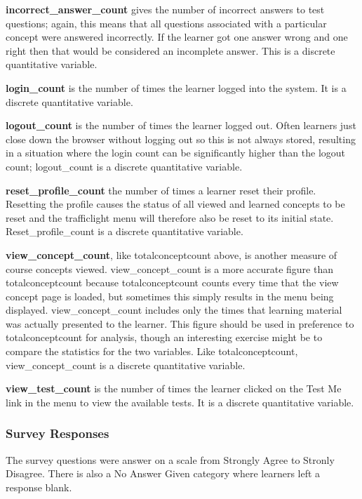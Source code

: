 \documentclass[12pt,twoside]{article}
\begin{document}
\textbf{incorrect\_answer\_count} gives the number of incorrect answers
to test questions; again, this means that all questions associated with
a particular concept were answered incorrectly. If the learner got one
answer wrong and one right then that would be considered an incomplete
answer. This is a discrete quantitative variable. 

\textbf{login\_count} is the number of times the learner logged into the
system. It is a discrete quantitative variable. 

\textbf{logout\_count} is the number of times the learner logged out.
Often learners just close down the browser without logging out so this
is not always stored, resulting in a situation where the login count
can be significantly higher than the logout count; logout\_count is a
discrete quantitative variable. 

\textbf{reset\_profile\_count} the number of times a learner reset their
profile. Resetting the profile causes the status of all viewed and
learned concepts to be reset and the trafficlight menu will therefore
also be reset to its initial state. Reset\_profile\_count is a discrete
quantitative variable. 

\textbf{view\_concept\_count}, like totalconceptcount above, is another
measure of course concepts viewed. view\_concept\_count is a more
accurate figure than totalconceptcount because totalconceptcount counts
every time that the view concept page is loaded, but sometimes this
simply results in the menu being displayed. view\_concept\_count
includes only the times that learning material was actually presented
to the learner. This figure should be used in preference to
totalconceptcount for analysis, though an interesting exercise might be
to compare the statistics for the two variables. Like
totalconceptcount, view\_concept\_count is a discrete quantitative
variable. 

\textbf{view\_test\_count} is the number of times the learner clicked on
the {\textquotedbl}Test Me{\textquotedbl} link in the menu to view the
available tests. It is a discrete quantitative variable. 

\subsubsection[Survey Responses ]{\textrm{Survey Responses} }
The survey questions were answer on a scale from Strongly Agree to
Stronly Disagree. There is also a {\textquotedbl}No Answer
Given{\textquotedbl} category where learners left a response blank. 
\end{document}
